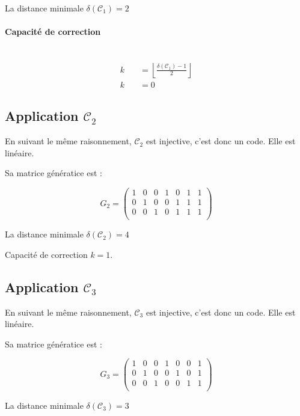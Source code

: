 \documentclass[a4paper,11pt]{article}
\begin{document}
\vspace{2ex}
La distance minimale $\delta{(\mathcal{C}_1)}=2$

\paragraph{Capacité de correction}~\\
\[
    \begin{split}
    k\quad &=\left\lfloor\frac{\delta(\mathcal{C}_1)-1}{2}\right\rfloor \\
    k\quad &=0
    \end{split}
\]

\subsection*{Application $\mathcal{C}_2$}

En suivant le même raisonnement, $\mathcal{C}_2$ est injective, c'est donc un code. Elle est linéaire.

Sa matrice génératice est :

\[
    G_2=
    \left (
    \begin{array}{ccccccc}
        1&0&0&1&0&1&1 \\
        0&1&0&0&1&1&1 \\
        0&0&1&0&1&1&1 \\
    \end{array}
    \right )
\]

\vspace{2ex}
La distance minimale $\delta{(\mathcal{C}_2)}=4$

Capacité de correction $k=1$.


\subsection*{Application $\mathcal{C}_3$}

En suivant le même raisonnement, $\mathcal{C}_3$ est injective, c'est donc un code. Elle est linéaire.

Sa matrice génératice est :

\[
    G_3=
    \left (
    \begin{array}{ccccccc}
        1&0&0&1&0&0&1 \\
        0&1&0&0&1&0&1 \\
        0&0&1&0&0&1&1 \\
    \end{array}
    \right )
\]

\vspace{2ex}
La distance minimale $\delta{(\mathcal{C}_3)}=3$
\end{document}
